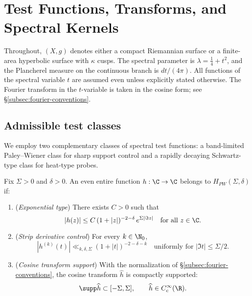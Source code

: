 
\section{Test Functions, Transforms, and Spectral Kernels}
\label{sec:test-func-transforms-part2}

\noindent
Throughout, $(X,g)$ denotes either a compact Riemannian surface or a finite-area hyperbolic surface with $\kappa$ cusps. The spectral parameter is $\lambda=\frac14+t^2$, and the Plancherel measure on the continuous branch is $dt/(4\pi)$. All functions of the spectral variable $t$ are assumed even unless explicitly stated otherwise. The Fourier transform in the $t$-variable is taken in the cosine form; see \S\ref{subsec:fourier-conventions}.

\subsection{Admissible test classes}
\label{subsec:admissible-classes}

We employ two complementary classes of spectral test functions: a band-limited Paley–Wiener class for sharp support control and a rapidly decaying Schwartz-type class for heat-type probes.

\begin{definition}
\label{def:PW}
Fix $\Sigma>0$ and $\delta>0$. An even entire function $h:\C\to\C$ belongs to $H_{PW}(\Sigma,\delta)$ if:
\begin{enumerate}[label=(\roman*)]
  \item (\emph{Exponential type}) There exists $C>0$ such that
  \[
    |h(z)| \le C\, (1+|z|)^{-2-\delta}\, e^{\Sigma |\Im z|}\quad \text{for all } z\in\C.
  \]
  \item (\emph{Strip derivative control}) For every $k\in\N_0$,
  \[
    |h^{(k)}(t)| \ll_{k,\delta,\Sigma} (1+|t|)^{-2-\delta-k}\quad \text{uniformly for } |\Im t|\le \Sigma/2.
  \]
  \item (\emph{Cosine transform support}) With the normalization of \S\ref{subsec:fourier-conventions}, the cosine transform $\widehat h$ is compactly supported:
  \[
     \supp \widehat h \subset [-\Sigma,\Sigma],\qquad \widehat h\in C_c^\infty(\R).
  \]
\end{enumerate}
\end{definition}

